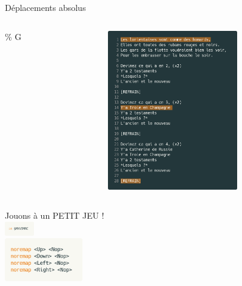 \documentclass[10pt]{beamer}
\begin{document}
	\begin{frame}{Déplacements absolus}
		\begin{columns}[C]
			\begin{column}{0.48\textwidth}
					\%
					G
			\end{column}
			\begin{column}{0.47\textwidth}
				\includegraphics[width=160pt]{img/position.png}
			\end{column}
		\end{columns}

	\end{frame}

	\begin{frame}[standout]
		Jouons à un PETIT JEU !\\
		\vspace{10pt}
		\includegraphics[width=48]{img/edit-vimrc.png}\\
		\vspace{10pt}
		\includegraphics[width=128]{img/harder.png}
	\end{frame}
\end{document}
